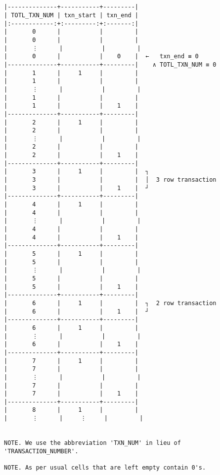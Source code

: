 \documentclass[varwidth=\maxdimen,margin=0.5cm,multi={verbatim}]{standalone}
\begin{document}
\begin{verbatim}


|--------------+-----------+---------|
| TOTL_TXN_NUM | txn_start | txn_end |
|:------------:+:---------:+:-------:|
|       0      |           |         |
|       0      |           |         |
|       ⋮      |           |         |
|       0      |           |    0    |  ←   txn_end ≡ 0
|--------------+-----------+---------|    ∧ TOTL_TXN_NUM ≡ 0
|       1      |     1     |         |
|       1      |           |         |
|       ⋮      |           |         |
|       1      |           |         |
|       1      |           |    1    |
|--------------+-----------+---------|
|       2      |     1     |         |
|       2      |           |         |
|       ⋮      |           |         |
|       2      |           |         |
|       2      |           |    1    |
|--------------+-----------+---------|
|       3      |     1     |         |  ┐
|       3      |           |         |  │  3 row transaction
|       3      |           |    1    |  ┘
|--------------+-----------+---------|
|       4      |     1     |         |
|       4      |           |         |
|       ⋮      |           |         |
|       4      |           |         |
|       4      |           |    1    |
|--------------+-----------+---------|
|       5      |     1     |         |
|       5      |           |         |
|       ⋮      |           |         |
|       5      |           |         |
|       5      |           |    1    |
|--------------+-----------+---------|
|       6      |     1     |         |  ┐  2 row transaction
|       6      |           |    1    |  ┘
|--------------+-----------+---------|  
|       6      |     1     |         |
|       ⋮      |           |         |
|       6      |           |    1    |
|--------------+-----------+---------|
|       7      |     1     |         |
|       7      |           |         |
|       ⋮      |           |         |
|       7      |           |         |
|       7      |           |    1    |
|--------------+-----------+---------|
|       8      |     1     |         |
|       ⋮      |     ⋮     |         |


NOTE. We use the abbreviation 'TXN_NUM' in lieu of 'TRANSACTION_NUMBER'.

NOTE. As per usual cells that are left empty contain 0's.

\end{verbatim}
\end{document}
